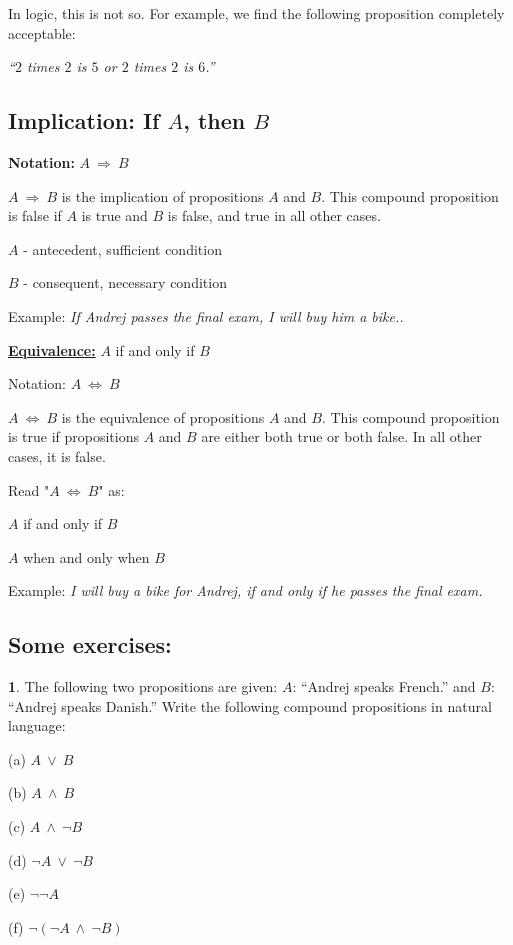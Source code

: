 \documentclass[11pt,paper=b5,footinclude,headinclude]{scrbook} %
\def\ali {{~\vee~}}
\def\inn {{~\wedge~}}
\def\sledi {{~\Rightarrow~}}
\def\cee {{~\Leftrightarrow~}}
\theoremstyle{remark}
\theoremstyle{definition} %
\begin{document}
In logic, this is not so. For example, we find the following proposition completely acceptable:

{\em ``$2$ times $2$ is $5$ or $2$ times $2$ is $6$.''}

\medskip
\subsection{Implication: If $A$, then $B$}

\textbf{Notation:} $A\sledi B$

$A\sledi B$ is the implication of propositions $A$ and $B$.
This compound proposition is false if $A$ is true and $B$ is false, and true in all other cases.

$A$ - antecedent, sufficient condition

$B$ - consequent, necessary condition

Example: {\em If Andrej passes the final exam, I will buy him a bike..}

\medskip
{\textbf \underline{Equivalence:}} $A$ if and only if $B$

Notation: $A\cee B$

$A\cee B$ is the equivalence of propositions $A$ and $B$.
This compound proposition is true if propositions $A$ and $B$
are either both true or both false. In all other cases, it is false.

Read "$A\cee B$" as:

$A$ if and only if $B$

$A$ when and only when $B$

Example: {\em I will buy a bike for Andrej, if and only if he passes the final exam.}

\bigskip

\subsection*{Some exercises:}

{\textbf 1.}
The following two propositions are given:
$A$: ``Andrej speaks French.'' and $B$: ``Andrej speaks Danish.''
Write the following compound propositions in natural language:

(a) $A\ali B$

(b) $A\inn B$

(c) $A\inn \neg B$

(d) $\neg A\ali \neg B$

(e) $\neg \neg A$

(f) $\neg (\neg A\inn \neg B)$
\end{document}
